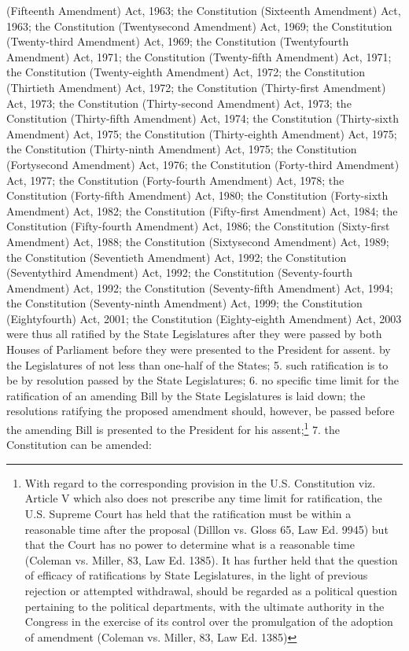 \begin{multicols}{2}
{(Fifteenth Amendment) Act, 1963; the Constitution (Sixteenth Amendment) Act, 1963; the Constitution (Twentysecond Amendment) Act, 1969; the Constitution (Twenty-third Amendment) Act, 1969; the Constitution
(Twentyfourth Amendment) Act, 1971; the Constitution (Twenty-fifth Amendment) Act, 1971; the Constitution
(Twenty-eighth Amendment) Act, 1972; the Constitution (Thirtieth Amendment) Act, 1972; the Constitution
(Thirty-first Amendment) Act, 1973; the Constitution (Thirty-second Amendment) Act, 1973; the Constitution
(Thirty-fifth Amendment) Act, 1974; the Constitution (Thirty-sixth Amendment) Act, 1975; the Constitution
(Thirty-eighth Amendment) Act, 1975; the Constitution (Thirty-ninth Amendment) Act, 1975; the Constitution
(Fortysecond Amendment) Act, 1976; the Constitution (Forty-third Amendment) Act, 1977; the Constitution
(Forty-fourth Amendment) Act, 1978; the Constitution (Forty-fifth Amendment) Act, 1980; the Constitution
(Forty-sixth Amendment) Act, 1982; the Constitution (Fifty-first Amendment) Act, 1984; the Constitution (Fifty-fourth Amendment) Act, 1986; the Constitution (Sixty-first Amendment) Act, 1988; the Constitution (Sixtysecond Amendment) Act, 1989; the Constitution (Seventieth Amendment) Act, 1992; the Constitution
(Seventythird Amendment) Act, 1992; the Constitution (Seventy-fourth Amendment) Act, 1992; the Constitution
(Seventy-fifth Amendment) Act, 1994; the Constitution (Seventy-ninth Amendment) Act, 1999; the Constitution
(Eightyfourth) Act, 2001; the Constitution (Eighty-eighth Amendment) Act, 2003 were thus all ratified by the
State Legislatures after they were passed by both Houses of Parliament before they were presented to the President
for assent.} by the Legislatures of not less than one-half of the States; 5. such ratification is to be by
resolution passed by the State Legislatures; 6. no specific time limit for the ratification of an
amending Bill by the State Legislatures is laid down; the resolutions ratifying the proposed
amendment should, however, be passed before the amending Bill is presented to the President
for his assent;\footnote{With regard to the corresponding provision in the U.S. Constitution viz. Article V which also does not prescribe any time limit for ratification, the U.S. Supreme Court has held that the ratification must be within a reasonable
time after the proposal (Dilllon vs. Gloss 65, Law Ed. 9945) but that the Court has no power to determine what is
a reasonable time (Coleman vs. Miller, 83, Law Ed. 1385). It has further held that the question of efficacy of
ratifications by State Legislatures, in the light of previous rejection or attempted withdrawal, should be regarded
as a political question pertaining to the political departments, with the ultimate authority in the Congress in the
exercise of its control over the promulgation of the adoption of amendment (Coleman vs. Miller, 83, Law Ed.
1385)} 7. the Constitution can be amended:


\end{multicols}
